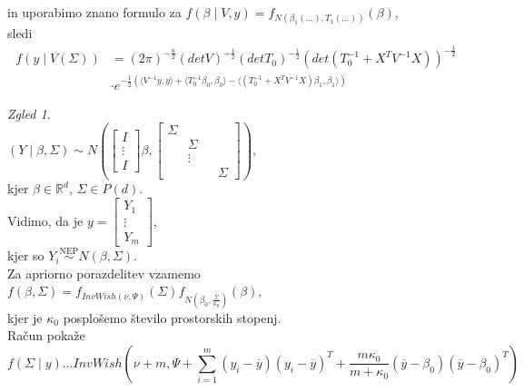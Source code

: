 \documentclass[a4paper, 12pt]{book}
\theoremstyle{definition}
\theoremstyle{remark}
\newtheorem*{exmp}{Zgled}
\newcommand{\R}{\mathbb{R}}
\begin{document}
\begin{itemize}
        in uporabimo znano formulo za $f(\beta \mid V, y) = f_{N(\beta_1(\dots), T_1(\dots))}(\beta)$, \\
        sledi
        \begin{align*}
            f(y \mid V(\Sigma)) &= (2 \pi)^{-\frac{n}{2}} (det V)^{-\frac{1}{2}}
                (det T_0)^{-\frac{1}{2}} (det (T_0^{-1} + X^T V^{-1} X))^{-\frac{1}{2}} \\
            &\cdot e^{-\frac{1}{2} \left(\langle V^{-1} y, y \rangle + \langle T_0^{-1} \beta_0, \beta_0 \rangle
                - \langle (T_0^{-1} + X^T V^{-1} X) \beta_1, \beta_1 \rangle\right)}
        \end{align*}
        \begin{exmp} \text{} \\
            $(Y \mid \beta, \Sigma) \sim N\left(\begin{bmatrix} I \\ \vdots \\ I \end{bmatrix} \beta,
            \begin{bmatrix}
                \Sigma & & & \\
                & \Sigma & & \\
                & \vdots & & \\
                & & & \Sigma
            \end{bmatrix}\right)$, \\
            kjer $\beta \in \R^d$, $\Sigma \in P(d)$. \\
            Vidimo, da je $y = \begin{bmatrix}Y_1 \\ \vdots \\ Y_m\end{bmatrix}$, \\
            kjer so $Y_i \stackrel{\text{NEP}}{\sim} N(\beta, \Sigma)$. \\
            Za apriorno porazdelitev vzamemo \\
            $f(\beta, \Sigma) = f_{InvWish(\nu, \Psi)}(\Sigma) f_{N\left(\beta_0, \frac{\Sigma}{\kappa_0}\right)}(\beta)$, \\
            kjer je $\kappa_0$ posplošemo število prostorskih stopenj. \\
            Račun pokaže
            \begin{equation*}
                f(\Sigma \mid y) \dots InvWish \left(\nu + m, \Psi + \sum_{i=1}^m (y_i - \overline{y}) (y_i - \overline{y})^T
                    + \frac{m \kappa_0}{m + \kappa_0} (\overline{y} - \beta_0) (\overline{y} - \beta_0)^T\right)

\end{equation*}
\end{exmp}
\end{itemize}
\end{document}
